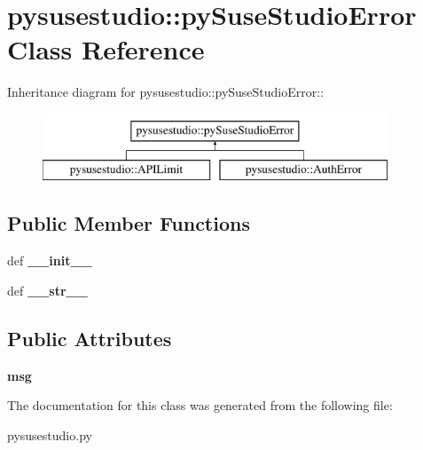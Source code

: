 \hypertarget{classpysusestudio_1_1py_suse_studio_error}{
\section{pysusestudio::pySuseStudioError Class Reference}
\label{classpysusestudio_1_1py_suse_studio_error}
}
Inheritance diagram for pysusestudio::pySuseStudioError::\begin{figure}[H]
\begin{center}
\leavevmode
\includegraphics[height=2cm]{classpysusestudio_1_1py_suse_studio_error}
\end{center}
\end{figure}
\subsection*{Public Member Functions}
\begin{DoxyCompactItemize}
\item 
\hypertarget{classpysusestudio_1_1py_suse_studio_error_a33c11152c3ff0ca6d729b89d36eba82c}{
def {\bfseries \_\-\_\-init\_\-\_\-}}
\label{classpysusestudio_1_1py_suse_studio_error_a33c11152c3ff0ca6d729b89d36eba82c}

\item 
\hypertarget{classpysusestudio_1_1py_suse_studio_error_ae5f1e697e1a50f637188a465447e4796}{
def {\bfseries \_\-\_\-str\_\-\_\-}}
\label{classpysusestudio_1_1py_suse_studio_error_ae5f1e697e1a50f637188a465447e4796}

\end{DoxyCompactItemize}
\subsection*{Public Attributes}
\begin{DoxyCompactItemize}
\item 
\hypertarget{classpysusestudio_1_1py_suse_studio_error_abf28bfaa1aa3afdb3b7c4d653e408f23}{
{\bfseries msg}}
\label{classpysusestudio_1_1py_suse_studio_error_abf28bfaa1aa3afdb3b7c4d653e408f23}

\end{DoxyCompactItemize}


The documentation for this class was generated from the following file:\begin{DoxyCompactItemize}
\item 
pysusestudio.py\end{DoxyCompactItemize}
